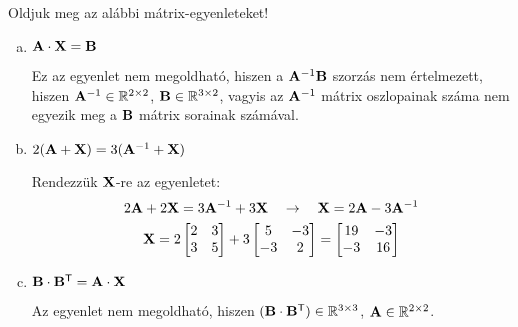 \begin{exercise}{Oldjuk meg az alábbi mátrix-egyenleteket!}
{\begin{enumerate}[a)]
            \tcbline
      \item $\mathbf{A} \cdot \mathbf{X} = \mathbf{B}$

            Ez az egyenlet nem megoldható, hiszen a $\mathbf{A}^{-1} \mathbf{B}$
            szorzás nem értelmezett, hiszen $\mathbf{A}^{-1} \in
              \mathbb R^{2 \times 2}$, $\mathbf{B} \in \mathbb R^{3 \times 2}$,
            vagyis az $\mathbf{A}^{-1}$ mátrix oszlopainak száma nem egyezik meg
            a $\mathbf{B}$ mátrix sorainak számával.

            \tcbline
      \item $2(\mathbf{A} + \mathbf{X}) = 3(\mathbf{A}^{-1} + \mathbf{X})$

            Rendezzük $\mathbf{X}$-re az egyenletet:
            \begin{gather*}
              2 \mathbf{A} + 2 \mathbf{X} = 3 \mathbf{A}^{-1} + 3 \mathbf{X}
              \quad \rightarrow \quad
              \mathbf{X} = 2 \mathbf{A} - 3 \mathbf{A}^{-1}
              \\
              \mathbf{X} = 2 \begin{bmatrix}
                2 & 3 \\ 3 & 5
              \end{bmatrix} + 3 \begin{bmatrix}
                5 & -3 \\ -3 & 2
              \end{bmatrix} = \begin{bmatrix}
                19 & -3 \\ -3 & 16
              \end{bmatrix}
            \end{gather*}

            \tcbline
      \item $\mathbf{B} \cdot \mathbf{B}^{\mathsf T} = \mathbf{A} \cdot \mathbf{X}$

            Az egyenlet nem megoldható, hiszen $(\mathbf{B} \cdot \mathbf{B}^{\mathsf T})
              \in \mathbb R^{3 \times 3}$, $\mathbf{A} \in \mathbb R^{2 \times 2}$.
    \end{enumerate}
  }
\end{exercise}
